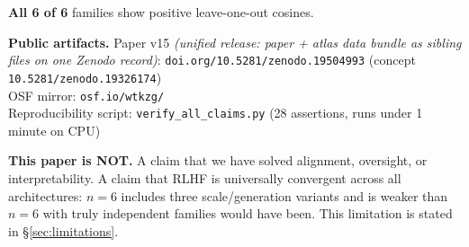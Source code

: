 \documentclass[11pt,letterpaper]{article}
\begin{document}
\begin{execbox}
\textbf{All 6 of 6} families show positive leave-one-out cosines.

\textbf{Public artifacts.}
\textbullet\; Paper v15 \textit{(unified release: paper + atlas data
bundle as sibling files on one Zenodo record)}:
\texttt{doi.org/10.5281/zenodo.19504993}
(concept \texttt{10.5281/zenodo.19326174})\\
\textbullet\; OSF mirror: \texttt{osf.io/wtkzg/}\\
\textbullet\; Reproducibility script: \texttt{verify\_all\_claims.py}
(28 assertions, runs under 1 minute on CPU)

\textbf{This paper is NOT.}
\textbullet\; A claim that we have solved alignment, oversight, or
interpretability.
\textbullet\; A claim that RLHF is universally convergent across all
architectures: $n\!=\!6$ includes three scale/generation variants and is
weaker than $n\!=\!6$ with truly independent families would have been. This
limitation is stated in \S\ref{sec:limitations}.

\end{execbox}
\end{document}
